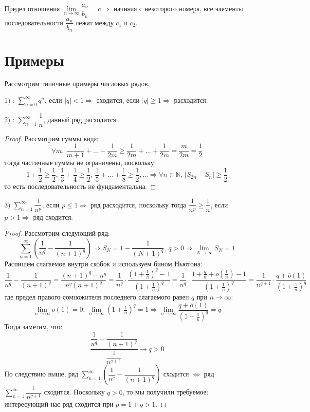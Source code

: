 \documentclass[12pt]{article}
\newcommand{\MN}{\mathbb{N}}
\theoremstyle{definition}
\begin{document}
Предел отношения $\lim\limits_{n \to \infty}\dfrac{a_n}{b_n} = c \Rightarrow$ начиная с некоторого номера, все элементы последовательности $\dfrac{a_n}{b_n}$ лежат между $c_1$ и $c_2$.

\newpage
\section*{Примеры}
Рассмотрим типичные примеры числовых рядов.

$1)$ : $\displaystyle \sum\limits_{n = 0}^{\infty}q^n$, если $|q| < 1 \Rightarrow$ сходится, если $|q| \geq 1 \Rightarrow$ расходится.

$2)$ :  $\displaystyle \sum\limits_{n = 1}^{\infty}\dfrac{1}{n}$, данный ряд расходится.
\begin{proof}
	Рассмотрим суммы вида:
	$$
		\forall m, \, \dfrac{1}{m+1} + \dotsc + \dfrac{1}{2m} \geq \dfrac{1}{2m} + \dotsc + \dfrac{1}{2m} = \dfrac{m}{2m} = \dfrac{1}{2}
	$$
	тогда частичные суммы не ограничены, поскольку: 
	$$
		1 + \dfrac{1}{2} \geq \dfrac{1}{2}, \, \dfrac{1}{3} + \dfrac{1}{4} \geq \dfrac{1}{2}, \, \dfrac{1}{5} + \dotsc + \dfrac{1}{8} \geq \dfrac{1}{2} ,\dotsc \Rightarrow \forall n \in \MN, \, |S_{2n} - S_{n}| \geq \dfrac{1}{2}
	$$
	то есть последовательность не фундаментальна.
\end{proof}

$3)$ $\displaystyle \sum\limits_{n=1}^{\infty} \dfrac{1}{n^p}$, если $p \leq 1 \Rightarrow$ ряд расходится, поскольку тогда $\dfrac{1}{n^p} \geq \dfrac{1}{n}$, если $p > 1 \Rightarrow$ ряд сходится.
\begin{proof}
	Рассмотрим следующий ряд:
	$$
		\sum\limits_{n = 1}^{\infty}\left(\dfrac{1}{n^q} - \dfrac{1}{(n+1)^q}\right) \Rightarrow S_N = 1 - \dfrac{1}{(N+1)^q}, \, q > 0 \Rightarrow \lim\limits_{N \to \infty} S_N = 1
	$$
	Распишем слагаемое внутри скобок и используем бином Ньютона:
	$$
 		\dfrac{1}{n^q} - \dfrac{1}{(n+1)^q} = \dfrac{(n+1)^q - n^q}{n^q (n+1)^q} = \dfrac{1}{n^q}{\cdot}\dfrac{\left(1 + \tfrac{1}{n}\right)^q -1 }{\left(1 + \tfrac{1}{n}\right)^q} = \dfrac{1}{n^q}{\cdot}\dfrac{1 + \tfrac{q}{n} + \overline{o}\left(\tfrac{1}{n}\right) - 1 }{\left(1 + \tfrac{1}{n}\right)^q} = \dfrac{1}{n^{q+1}}{\cdot}\dfrac{q + \overline{o}(1)}{\left(1 + \tfrac{1}{n}\right)^q}
	$$
	где предел правого сомножителя последнего слагаемого равен $q$ при $n\to \infty$: 
	$$
		\lim\limits_{n \to \infty}\overline{o}(1) = 0, \, \lim\limits_{n \to \infty}(1 + \tfrac{1}{n})^q = 1 \Rightarrow \lim\limits_{n \to \infty} \dfrac{q + \overline{o}(1)}{(1 + \tfrac{1}{n})^q} = q
	$$
	Тогда заметим, что:
	$$
		\dfrac{\dfrac{1}{n^q} - \dfrac{1}{(n+1)^q}}{\dfrac{1}{n^{q+1}}} \to q > 0
	$$
	По следствию выше, ряд $\displaystyle \sum\limits_{n = 1}^{\infty}\left(\dfrac{1}{n^q} - \dfrac{1}{(n+1)^q}\right)$ сходится $\Leftrightarrow$ ряд $\displaystyle \sum\limits_{n = 1}^{\infty}\dfrac{1}{n^{q+1}}$ сходится. Поскольку $q > 0$, то мы получили требуемое: интересующий нас ряд сходится при $p = 1 + q > 1$.
\end{proof}
\newpage
\end{document}
